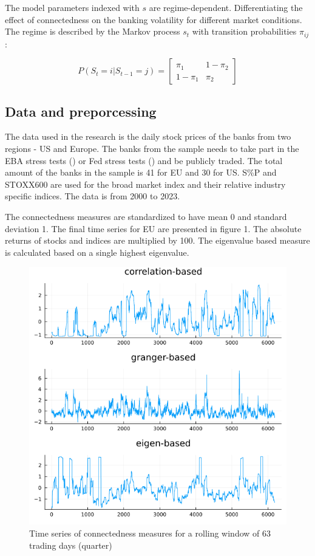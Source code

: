 \documentclass{article}
\begin{document}
The model parameters indexed with $s$ are regime-dependent. Differentiating the effect of connectedness on the banking volatility for different market conditions. The regime is described by the Markov process $s_t$ with transition probabilities $\pi_{ij}$:

\begin{equation*}
  P(S_t = i | S_{t-1} = j) = \begin{bmatrix}
    \pi_1 & 1 - \pi_2\\
      1 - \pi_1 & \pi_2
      \end{bmatrix}
\end{equation*}

\subsection*{Data and preporcessing}

The data used in the research is the daily stock prices of the banks from two regions - US and Europe. The banks from the sample needs to take part in the EBA stress tests (\citet{eba}) or Fed stress tests (\citet{fed}) and be publicly traded. The total amount of the banks in the sample is 41 for EU and 30 for US. S\%P and STOXX600 are used for the broad market index and their relative industry specific indices. The data is from 2000 to 2023.

The connectedness measures are standardized to have mean 0 and standard deviation 1. The final time series for EU are presented in figure 1. The absolute returns of stocks and indices are multiplied by 100. The eigenvalue based measure is calculated based on a single highest eigenvalue. 

\begin{figure}[t]
  \caption{Time series of connectedness measures for a rolling window of 63 trading days (quarter)}
  \includegraphics[scale=0.5]{connectmeasures.png}
  \centering
\end{figure}
\end{document}
